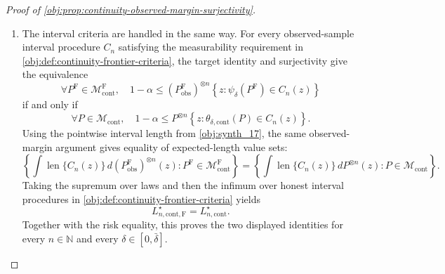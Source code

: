 \begin{proof}[Proof of \cref{obj:prop:continuity-observed-margin-surjectivity}]
\begin{enumerate}
\item The interval criteria are handled in the same way.  For every observed-sample interval procedure \(C_n\) satisfying the measurability requirement in \cref{obj:def:continuity-frontier-criteria}, the target identity and surjectivity give the equivalence
\[
\forall P^{\mathrm F}\in\mathcal M_{\mathrm{cont}}^{\mathrm F},\quad
1-\alpha\le
(P^{\mathrm F}_{\mathrm{obs}})^{\otimes n}
\!\left\{z:\psi_\delta(P^{\mathrm F})\in C_n(z)\right\}
\]
if and only if
\[
\forall P\in\mathcal M_{\mathrm{cont}},\quad
1-\alpha\le
P^{\otimes n}
\!\left\{z:\theta_{\delta,\mathrm{cont}}(P)\in C_n(z)\right\}.
\]
Using the pointwise interval length from \cref{obj:synth_17}, the same observed-margin argument gives equality of expected-length value sets:
\[
\left\{
\int \operatorname{len}\{C_n(z)\}\,d(P^{\mathrm F}_{\mathrm{obs}})^{\otimes n}(z):
P^{\mathrm F}\in\mathcal M_{\mathrm{cont}}^{\mathrm F}
\right\}
=
\left\{
\int \operatorname{len}\{C_n(z)\}\,dP^{\otimes n}(z):
P\in\mathcal M_{\mathrm{cont}}
\right\}.
\]
Taking the supremum over laws and then the infimum over honest interval procedures in \cref{obj:def:continuity-frontier-criteria} yields
\[
L_{n,\mathrm{cont},\mathrm F}^\star
=
L_{n,\mathrm{cont}}^\star .
\]
Together with the risk equality, this proves the two displayed identities for every \(n\in\mathbb N\) and every \(\delta\in[0,\bar\delta]\). %
\end{enumerate}
\end{proof}

